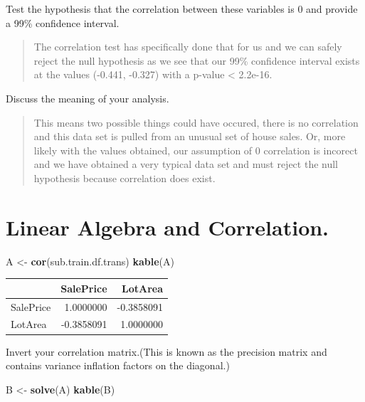 \documentclass[]{article}
\newenvironment{Shaded}{\begin{snugshade}}{\end{snugshade}}
\newcommand{\KeywordTok}[1]{\textcolor[rgb]{0.13,0.29,0.53}{\textbf{{#1}}}}
\newcommand{\StringTok}[1]{\textcolor[rgb]{0.31,0.60,0.02}{{#1}}}
\newcommand{\NormalTok}[1]{{#1}}
\begin{document}
Test the hypothesis that the correlation between these variables is 0
and provide a 99\% confidence interval.

\begin{quote}
The correlation test has specifically done that for us and we can safely
reject the null hypothesis as we see that our 99\% confidence interval
exists at the values (-0.441, -0.327) with a p-value \textless{}
2.2e-16.
\end{quote}

Discuss the meaning of your analysis.

\begin{quote}
This means two possible things could have occured, there is no
correlation and this data set is pulled from an unusual set of house
sales. Or, more likely with the values obtained, our assumption of 0
correlation is incorect and we have obtained a very typical data set and
must reject the null hypothesis because correlation does exist.
\end{quote}

\section{Linear Algebra and
Correlation.}\label{linear-algebra-and-correlation.}

\begin{Shaded}
\begin{Highlighting}[]
\NormalTok{A <-}\StringTok{ }\KeywordTok{cor}\NormalTok{(sub.train.df.trans)}
\KeywordTok{kable}\NormalTok{(A)}
\end{Highlighting}
\end{Shaded}

\begin{longtable}[]{@{}lrr@{}}
\toprule
& SalePrice & LotArea\tabularnewline
\midrule
\endhead
SalePrice & 1.0000000 & -0.3858091\tabularnewline
LotArea & -0.3858091 & 1.0000000\tabularnewline
\bottomrule
\end{longtable}

Invert your correlation matrix.(This is known as the precision matrix
and contains variance inflation factors on the diagonal.)

\begin{Shaded}
\begin{Highlighting}[]
\NormalTok{B <-}\StringTok{ }\KeywordTok{solve}\NormalTok{(A)}
\KeywordTok{kable}\NormalTok{(B)}
\end{Highlighting}
\end{Shaded}
\end{document}
